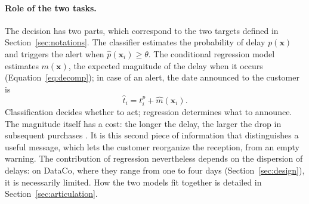 \documentclass[11pt,a4paper]{article}
\theoremstyle{definition}
\begin{document}
\paragraph{Role of the two tasks.} The decision has two parts, which correspond to the two targets defined in Section~\ref{sec:notations}. The classifier estimates the probability of delay $p(\mathbf{x})$ and triggers the alert when $\hat{p}(\mathbf{x}_i) \ge \theta$. The conditional regression model estimates $m(\mathbf{x})$, the expected magnitude of the delay when it occurs (Equation~\eqref{eq:decomp}); in case of an alert, the date announced to the customer is
\begin{equation}
  \hat{t}_i = t_i^{p} + \hat{m}(\mathbf{x}_i).
  \label{eq:date-annoncee}
\end{equation}
Classification decides whether to act; regression determines what to announce. The magnitude itself has a cost: the longer the delay, the larger the drop in subsequent purchases \cite{rao2011failure}. It is this second piece of information that distinguishes a useful message, which lets the customer reorganize the reception, from an empty warning. The contribution of regression nevertheless depends on the dispersion of delays: on DataCo, where they range from one to four days (Section~\ref{sec:design}), it is necessarily limited. How the two models fit together is detailed in Section~\ref{sec:articulation}.
\end{document}
